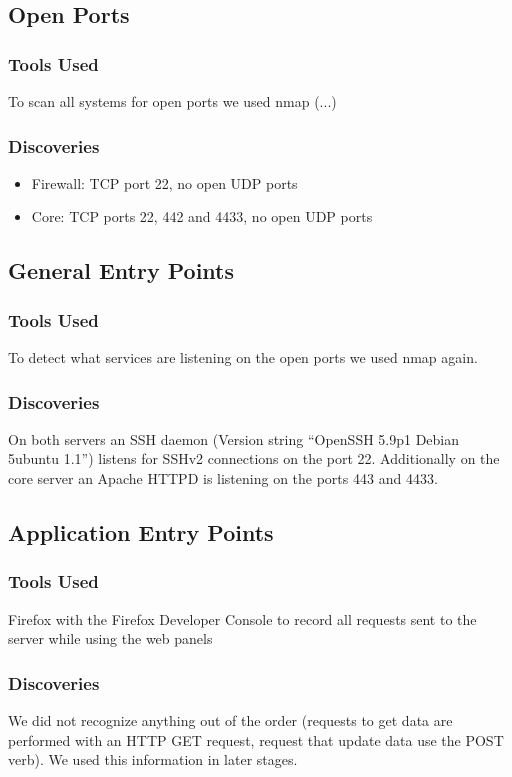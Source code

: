 \documentclass{article}
\begin{document}
\subsection{Open Ports}
\subsubsection{Tools Used}
To scan all systems for open ports we used nmap (...)

\subsubsection{Discoveries}
\begin{itemize}
\item Firewall: TCP port 22, no open UDP ports
\item Core: TCP ports 22, 442 and 4433, no open UDP ports
\end{itemize}

\subsection{General Entry Points}
\subsubsection{Tools Used}
To detect what services are listening on the open ports we used nmap again.

\subsubsection{Discoveries}
On both servers an SSH daemon (Version string ``OpenSSH 5.9p1 Debian 5ubuntu 1.1'') listens for SSHv2 connections on the port 22.\newline
Additionally on the core server an Apache HTTPD is listening on the ports 443 and 4433.

\subsection{Application Entry Points}
\subsubsection{Tools Used}
Firefox with the Firefox Developer Console to record all requests sent to the server while using the web panels

\subsubsection{Discoveries}
We did not recognize anything out of the order (requests to get data are performed with an HTTP GET request, request that update data use the POST verb). We used this information in later stages.
\end{document}

